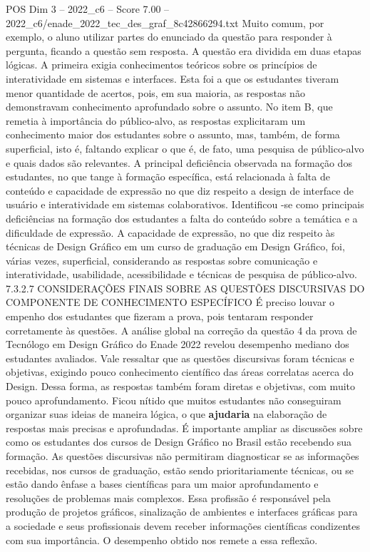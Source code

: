 \begin{textsample}{POS Dim 3 – 2022\_c6 – Score 7.00 – 2022\_c6/enade\_2022\_tec\_des\_graf\_8c42866294.txt}
Muito comum, por exemplo, o aluno utilizar partes do enunciado da questão para responder à pergunta, ficando a questão sem resposta.
A questão era dividida em duas etapas lógicas.
A primeira exigia conhecimentos teóricos sobre os princípios de interatividade em sistemas e interfaces.
Esta foi a que os estudantes tiveram menor quantidade de acertos, pois, em sua maioria, as respostas não demonstravam conhecimento aprofundado sobre o assunto.
No item B, que remetia à importância do público-alvo, as respostas explicitaram um conhecimento maior dos estudantes sobre o assunto, mas, também, de forma superficial, isto é, faltando explicar o que é, de fato, uma pesquisa de público-alvo e quais dados são relevantes.
A principal deficiência observada na formação dos estudantes, no que tange à formação específica, está relacionada à falta de conteúdo e capacidade de expressão no que diz respeito a design de interface de usuário e interatividade em sistemas colaborativos.
Identificou -se como principais deficiências na formação dos estudantes a falta do conteúdo sobre a temática e a dificuldade de expressão.
A capacidade de expressão, no que diz respeito às técnicas de Design Gráfico em um curso de graduação em Design Gráfico, foi, várias vezes, superficial, considerando as respostas sobre comunicação e interatividade, usabilidade, acessibilidade e técnicas de pesquisa de público-alvo. 7.3.2.7 CONSIDERAÇÕES FINAIS SOBRE AS QUESTÕES DISCURSIVAS DO COMPONENTE DE CONHECIMENTO ESPECÍFICO É preciso louvar o empenho dos estudantes que fizeram a prova, pois tentaram responder corretamente às questões.
A análise global na correção da questão 4 da prova de Tecnólogo em Design Gráfico do Enade 2022 revelou desempenho mediano dos estudantes avaliados.
Vale ressaltar que as questões discursivas foram técnicas e objetivas, exigindo pouco conhecimento científico das áreas correlatas acerca do Design.
Dessa forma, as respostas também foram diretas e objetivas, com muito pouco aprofundamento.
Ficou nítido que muitos estudantes não conseguiram organizar suas ideias de maneira lógica, o que \textbf{ajudaria} na elaboração de respostas mais precisas e aprofundadas.
É importante ampliar as discussões sobre como os estudantes dos cursos de Design Gráfico no Brasil estão recebendo sua formação.
As questões discursivas não permitiram diagnosticar se as informações recebidas, nos cursos de graduação, estão sendo prioritariamente técnicas, ou se estão dando ênfase a bases científicas para um maior aprofundamento e resoluções de problemas mais complexos.
Essa profissão é responsável pela produção de projetos gráficos, sinalização de ambientes e interfaces gráficas para a sociedade e seus profissionais devem receber informações científicas condizentes com sua importância.
O desempenho obtido nos remete a essa reflexão.

\end{textsample}
